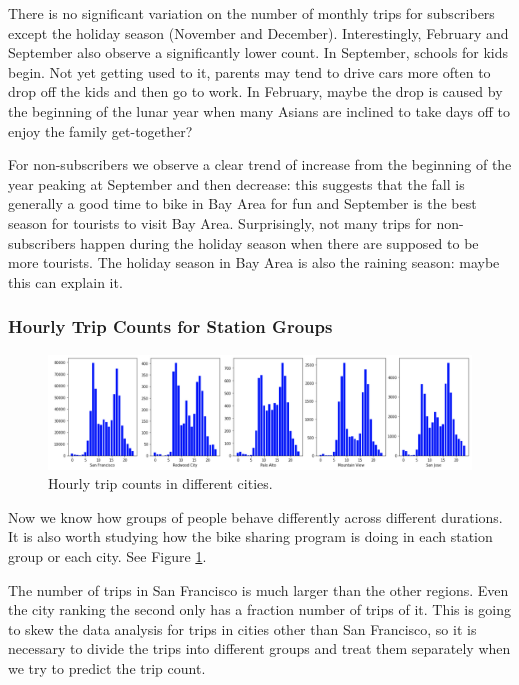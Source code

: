 \documentclass[a4paper]{article}
\begin{document}
			There is no significant variation on the number of monthly trips for subscribers except the holiday season (November and December). Interestingly, February and September also observe a significantly lower count. In September, schools for kids begin. Not yet getting used to it, parents may tend to drive cars more often to drop off the kids and then go to work. In February, maybe the drop is caused by the beginning of the lunar year when many Asians are inclined to take days off to enjoy the family get-together? 
			
			For non-subscribers we observe a clear trend of increase from the beginning of the year peaking at September and then decrease: this suggests that the fall is generally a good time to bike in Bay Area for fun and September is the best season for tourists to visit Bay Area. Surprisingly, not many trips for non-subscribers happen during the holiday season when there are supposed to be more tourists. The holiday season in Bay Area is also the raining season: maybe this can explain it.
			
			\subsubsection{Hourly Trip Counts for Station Groups}
			
			\begin{figure}
				\centering
				\includegraphics[width=1\textwidth]{HourlyTripsLocation.png}
				\caption{\label{fig:hourly_cities}Hourly trip counts in different cities.}
			\end{figure}	
			
			Now we know how groups of people behave differently across different durations. It is also worth studying how the bike sharing program is doing in each station group or each city. See Figure \ref{fig:hourly_cities}. 
			
			The number of trips in San Francisco is much larger than the other regions. Even the city ranking the second only has a fraction number of trips of it. This is going to skew the data analysis for trips in cities other than San Francisco, so it is necessary to divide the trips into different groups and treat them separately when we try to predict the trip count. 
			
\end{document}
